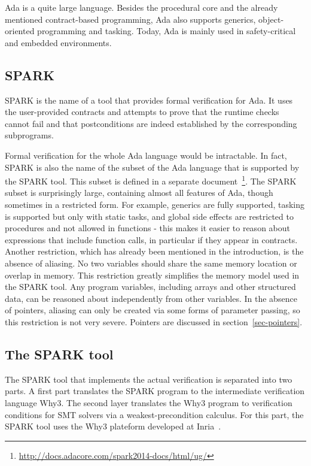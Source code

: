 \documentclass[runningheads]{llncs}
\begin{document}
Ada is a quite large language. Besides the procedural core and the already mentioned contract-based programming, Ada also supports generics, object-oriented programming and tasking. Today, Ada is mainly used in safety-critical and embedded environments.

\subsection{SPARK}
SPARK is the name of a tool that provides formal verification for Ada. It uses the user-provided contracts and attempts to prove that the runtime checks cannot fail and that postconditions are indeed established by the corresponding subprograms.

Formal verification for the whole Ada language would be intractable. In fact, SPARK is also the name of the subset of the Ada language that is supported by the SPARK tool. This subset is defined in a separate document~\footnote{\url{http://docs.adacore.com/spark2014-docs/html/ug/}}. The SPARK subset is surprisingly large, containing almost all features of Ada, though sometimes in a restricted form. For example, generics are fully supported, tasking is supported but only with static tasks, and global side effects are restricted to procedures and not allowed in functions - this makes it easier to reason about expressions that include function calls, in particular if they appear in contracts. 
Another restriction, which has already been mentioned in the introduction, is the absence of aliasing. No two variables should share the same memory location or overlap in memory. This restriction greatly simplifies the memory model used in the SPARK tool. Any program variables, including arrays and other structured data, can be reasoned about independently from other variables.
In the absence of pointers, aliasing can only be created via some forms of parameter passing, so this restriction is not very severe. Pointers are discussed in section~\ref{sec-pointers}.

\subsection{The SPARK tool}
The SPARK tool that implements the actual verification is separated into two parts. A first part translates the SPARK program to the intermediate verification language Why3. The second layer translates the Why3 program to verification conditions for SMT solvers via a weakest-precondition calculus. For this part, the SPARK tool uses the Why3 plateform developed at Inria~\cite{bobot2011why3}.
\end{document}
